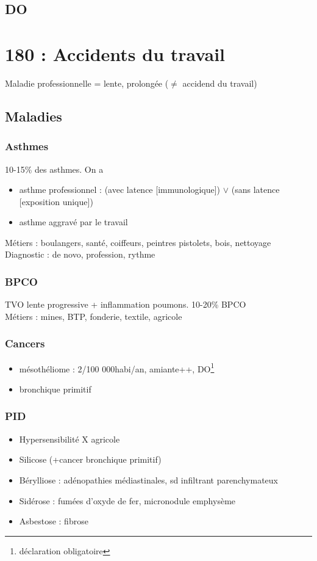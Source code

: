 \documentclass{article}
\begin{document}
\subsection{DO}



\section{180 : Accidents du travail}
Maladie professionnelle = lente, prolongée (\(\neq\) accidend du travail)
\subsection{Maladies}
\subsubsection{Asthmes}
10-15\% des asthmes. On a
\begin{itemize}
  \item asthme professionnel : (avec latence [immunologique]) \(\vee\) (sans latence
    [exposition unique])
  \item asthme aggravé par le travail
\end{itemize}
Métiers : boulangers, santé, coiffeurs, peintres pistolets, bois, nettoyage\\
Diagnostic : de novo, profession, rythme
\subsubsection{BPCO}
TVO lente progressive + inflammation poumons. 10-20\% BPCO\\
Métiers : mines, BTP, fonderie, textile, agricole
\subsubsection{Cancers}
\begin{itemize}
  \item mésothéliome : 2/100 000habi/an, amiante++, DO\footnote{déclaration obligatoire}
  \item bronchique primitif
\end{itemize}
\subsubsection{PID}
\begin{itemize}
  \item Hypersensibilité X agricole
  \item Silicose (+cancer bronchique primitif)
  \item Bérylliose : adénopathies médiastinales, sd infiltrant parenchymateux
  \item Sidérose : fumées d'oxyde de fer, micronodule \textpm{} emphysème
  \item Asbestose : fibrose
\end{itemize}
\end{document}
